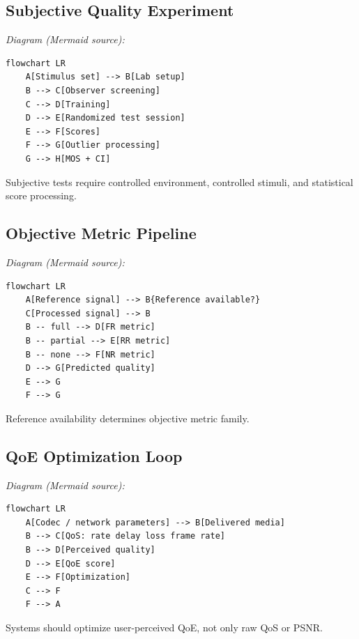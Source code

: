 \subsection{Subjective Quality Experiment}

\begin{center}\footnotesize\itshape Diagram (Mermaid source):\end{center}
\begin{verbatim}
flowchart LR
    A[Stimulus set] --> B[Lab setup]
    B --> C[Observer screening]
    C --> D[Training]
    D --> E[Randomized test session]
    E --> F[Scores]
    F --> G[Outlier processing]
    G --> H[MOS + CI]
\end{verbatim}

Subjective tests require controlled environment, controlled stimuli, and statistical score processing.

\subsection{Objective Metric Pipeline}

\begin{center}\footnotesize\itshape Diagram (Mermaid source):\end{center}
\begin{verbatim}
flowchart LR
    A[Reference signal] --> B{Reference available?}
    C[Processed signal] --> B
    B -- full --> D[FR metric]
    B -- partial --> E[RR metric]
    B -- none --> F[NR metric]
    D --> G[Predicted quality]
    E --> G
    F --> G
\end{verbatim}

Reference availability determines objective metric family.

\subsection{QoE Optimization Loop}

\begin{center}\footnotesize\itshape Diagram (Mermaid source):\end{center}
\begin{verbatim}
flowchart LR
    A[Codec / network parameters] --> B[Delivered media]
    B --> C[QoS: rate delay loss frame rate]
    B --> D[Perceived quality]
    D --> E[QoE score]
    E --> F[Optimization]
    C --> F
    F --> A
\end{verbatim}

Systems should optimize user-perceived QoE, not only raw QoS or PSNR.

